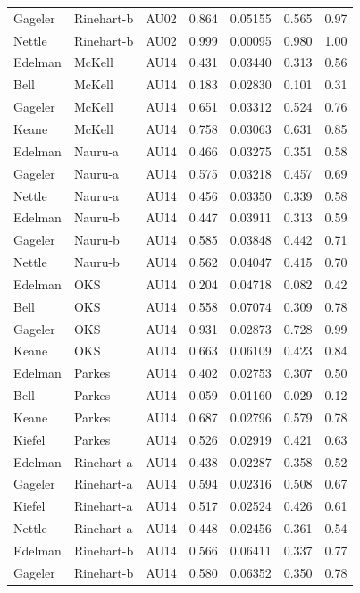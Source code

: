 \documentclass{monashthesis}
\begin{document}
\begin{center}
\begin{longtable}{lllllll}
Gageler & Rinehart-b & AU02 & 0.864 & 0.05155 & 0.565 & 0.97 \\
Nettle & Rinehart-b & AU02 & 0.999 & 0.00095 & 0.980 & 1.00 \\
Edelman & McKell & AU14 & 0.431 & 0.03440 & 0.313 & 0.56 \\
Bell & McKell & AU14 & 0.183 & 0.02830 & 0.101 & 0.31 \\
Gageler & McKell & AU14 & 0.651 & 0.03312 & 0.524 & 0.76 \\
Keane & McKell & AU14 & 0.758 & 0.03063 & 0.631 & 0.85 \\
Edelman & Nauru-a & AU14 & 0.466 & 0.03275 & 0.351 & 0.58 \\
Gageler & Nauru-a & AU14 & 0.575 & 0.03218 & 0.457 & 0.69 \\
Nettle & Nauru-a & AU14 & 0.456 & 0.03350 & 0.339 & 0.58 \\
Edelman & Nauru-b & AU14 & 0.447 & 0.03911 & 0.313 & 0.59 \\
Gageler & Nauru-b & AU14 & 0.585 & 0.03848 & 0.442 & 0.71 \\
Nettle & Nauru-b & AU14 & 0.562 & 0.04047 & 0.415 & 0.70 \\
Edelman & OKS & AU14 & 0.204 & 0.04718 & 0.082 & 0.42 \\
Bell & OKS & AU14 & 0.558 & 0.07074 & 0.309 & 0.78 \\
Gageler & OKS & AU14 & 0.931 & 0.02873 & 0.728 & 0.99 \\
Keane & OKS & AU14 & 0.663 & 0.06109 & 0.423 & 0.84 \\
Edelman & Parkes & AU14 & 0.402 & 0.02753 & 0.307 & 0.50 \\
Bell & Parkes & AU14 & 0.059 & 0.01160 & 0.029 & 0.12 \\
Keane & Parkes & AU14 & 0.687 & 0.02796 & 0.579 & 0.78 \\
Kiefel & Parkes & AU14 & 0.526 & 0.02919 & 0.421 & 0.63 \\
Edelman & Rinehart-a & AU14 & 0.438 & 0.02287 & 0.358 & 0.52 \\
Gageler & Rinehart-a & AU14 & 0.594 & 0.02316 & 0.508 & 0.67 \\
Kiefel & Rinehart-a & AU14 & 0.517 & 0.02524 & 0.426 & 0.61 \\
Nettle & Rinehart-a & AU14 & 0.448 & 0.02456 & 0.361 & 0.54 \\
Edelman & Rinehart-b & AU14 & 0.566 & 0.06411 & 0.337 & 0.77 \\
Gageler & Rinehart-b & AU14 & 0.580 & 0.06352 & 0.350 & 0.78 \\

\end{longtable}
\end{center}
\end{document}
